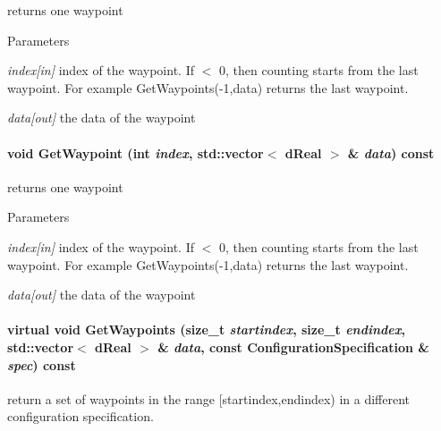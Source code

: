 returns one waypoint 


\begin{DoxyParams}{Parameters}
\item[{\em index\mbox{[}in\mbox{]}}]index of the waypoint. If $<$ 0, then counting starts from the last waypoint. For example GetWaypoints(-\/1,data) returns the last waypoint. \item[{\em data\mbox{[}out\mbox{]}}]the data of the waypoint \end{DoxyParams}
\hypertarget{classOpenRAVE_1_1TrajectoryBase_aaf8eb26adc6ee1d49723d97bc5b06fc6}{
\paragraph[{GetWaypoint}]{\setlength{\rightskip}{0pt plus 5cm}void GetWaypoint (int {\em index}, \/  std::vector$<$ dReal $>$ \& {\em data}) const}\hfill}
\label{classOpenRAVE_1_1TrajectoryBase_aaf8eb26adc6ee1d49723d97bc5b06fc6}


returns one waypoint 


\begin{DoxyParams}{Parameters}
\item[{\em index\mbox{[}in\mbox{]}}]index of the waypoint. If $<$ 0, then counting starts from the last waypoint. For example GetWaypoints(-\/1,data) returns the last waypoint. \item[{\em data\mbox{[}out\mbox{]}}]the data of the waypoint \end{DoxyParams}
\hypertarget{classOpenRAVE_1_1TrajectoryBase_a6a20ad14d835b86e00ecfb25fd1b2b3b}{
\paragraph[{GetWaypoints}]{\setlength{\rightskip}{0pt plus 5cm}virtual void GetWaypoints (size\_\-t {\em startindex}, \/  size\_\-t {\em endindex}, \/  std::vector$<$ dReal $>$ \& {\em data}, \/  const {\bf ConfigurationSpecification} \& {\em spec}) const}\hfill}
\label{classOpenRAVE_1_1TrajectoryBase_a6a20ad14d835b86e00ecfb25fd1b2b3b}


return a set of waypoints in the range \mbox{[}startindex,endindex) in a different configuration specification. 

